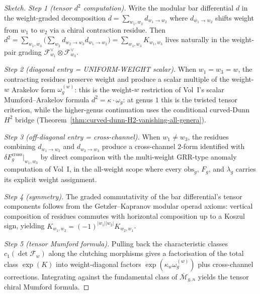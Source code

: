 \begin{proof}[Sketch]
\textit{Step 1 (tensor $d^2$ computation).} Write the modular bar
differential $d$ in the weight-graded decomposition
$d = \sum_{w_1, w_2} d_{w_1 \to w_2}$ where $d_{w_1 \to w_2}$
shifts weight from $w_1$ to $w_2$ via a chiral contraction
residue. Then
$d^2 = \sum_{w_1, w_3} \bigl(
 \sum_{w_2} d_{w_2 \to w_3} d_{w_1 \to w_2}\bigr)
 = \sum_{w_1, w_3} K_{w_1, w_3}$
lives naturally in the weight-pair grading
$\mathcal{F}_{w_1}^\vee \otimes \mathcal{F}_{w_3}^\vee$.

\textit{Step 2 (diagonal entry = UNIFORM-WEIGHT scalar).} When
$w_1 = w_3 = w$, the contracting residues preserve weight and
produce a scalar multiple of the weight-$w$ Arakelov form
$\omega_g^{(w)}$: this is the weight-$w$ restriction of Vol~I's
scalar Mumford--Arakelov formula $d^2 = \kappa \cdot \omega_g$:
at genus \(1\) this is the twisted tensor criterion, while the
higher-genus continuation uses the conditional curved-Dunn
\(H^2\) bridge
(Theorem~\ref{thm:curved-dunn-H2-vanishing-all-genera}).

\textit{Step 3 (off-diagonal entry = cross-channel).} When
$w_1 \ne w_3$, the residues combining $d_{w_1 \to w_2}$ and
$d_{w_2 \to w_3}$ produce a cross-channel $2$-form identified with
$\delta F_g^{\mathrm{cross}}|_{w_1, w_3}$ by direct comparison
with the multi-weight GRR-type anomaly computation of Vol~I, in the
all-weight scope where every $\mathrm{obs}_g$, $F_g$, and
$\lambda_g$ carries its explicit weight assignment.

\textit{Step 4 (symmetry).} The graded commutativity of the
bar differential's tensor components follows from the
Getzler--Kapranov modular operad axioms: vertical composition of
residues commutes with horizontal composition up to a Koszul
sign, yielding $K_{w_1, w_2} = (-1)^{|w_1||w_2|} K_{w_2, w_1}$.

\textit{Step 5 (tensor Mumford formula).} Pulling back the
characteristic classes $c_1(\det \mathcal{F}_w)$ along the
clutching morphisms gives a factorisation of the total class
$\exp(K)$ into weight-diagonal factors
$\exp(\kappa_w \omega_g^{(w)})$ plus cross-channel corrections.
Integrating against the fundamental class of
$\overline{\mathcal{M}}_{g,n}$ yields the tensor chiral Mumford
formula.
\end{proof}

